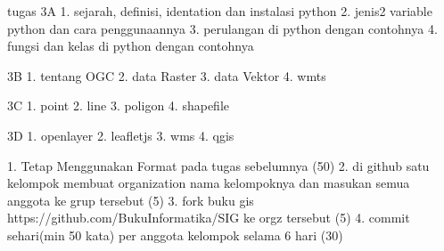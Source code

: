 tugas
3A
1. sejarah, definisi, identation dan instalasi python
2. jenis2 variable python dan cara penggunaannya
3. perulangan di python dengan contohnya
4. fungsi dan kelas di python dengan contohnya


3B 
1. tentang OGC
2. data Raster
3. data Vektor
4. wmts

3C
1. point
2. line
3. poligon
4. shapefile

3D
1. openlayer
2. leafletjs
3. wms
4. qgis




1. Tetap Menggunakan Format pada tugas sebelumnya (50)
2. di github satu kelompok membuat organization nama kelompoknya dan masukan semua anggota ke grup tersebut (5)
3. fork buku gis https://github.com/BukuInformatika/SIG ke orgz tersebut (5)
4. commit sehari(min 50 kata) per anggota kelompok selama 6 hari (30)